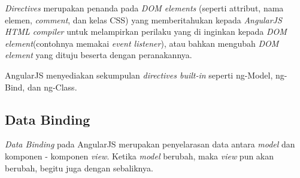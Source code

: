 	\textit{Directives} merupakan penanda pada \textit{DOM elements} (seperti attribut, nama elemen, \textit{comment},  dan kelas CSS) yang memberitahukan kepada \textit{AngularJS HTML compiler} untuk melampirkan perilaku yang di inginkan kepada \textit{DOM element}(contohnya memakai \textit{event listener}), atau bahkan mengubah \textit{DOM element} yang dituju beserta dengan peranakannya.
	
	AngularJS menyediakan sekumpulan \textit{directives built-in} seperti ng-Model, ng-Bind, dan ng-Class. 
	


\subsection{Data Binding}
\label{sub: dataBinding}
	
	\textit{Data Binding} pada AngularJS merupakan penyelarasan data antara \textit{model} dan komponen - komponen \textit{view}. Ketika \textit{model} berubah, maka \textit{view} pun akan berubah, begitu juga dengan sebaliknya.
	
